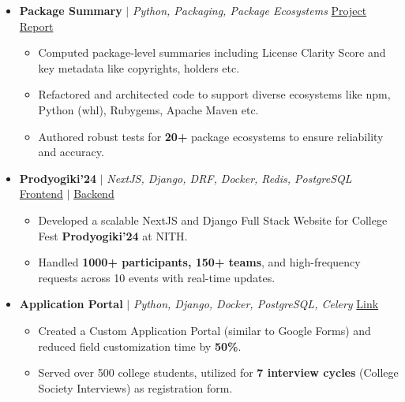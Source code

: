 \documentclass[7pt, legalpaper]{article}
\begin{document}
\begin{itemize}[leftmargin=*]
\item \textbf{Package Summary} $|$ \small \textit{Python, Packaging, Package Ecosystems}  \hfill \href{https://aboutcode.readthedocs.io/en/latest/archive/gsoc/reports/2024/scancode_toolkit_swastkk.html}{Project Report}

\normalsize{
\begin{itemize}[label=$\diamond$,itemsep=0pt, leftmargin=*]
    \item Computed package-level summaries including License Clarity Score and key metadata like copyrights, holders etc.
    \item Refactored and architected code to support diverse ecosystems like npm, Python (whl), Rubygems, Apache Maven etc.
    \item Authored robust tests for \textbf{20+} package ecosystems to ensure reliability and accuracy.
\end{itemize}
}
\item \textbf{Prodyogiki'24} $|$ \small \textit{NextJS, Django, DRF, Docker, Redis, PostgreSQL} \hfill \href{https://github.com/istenith/prody-frontend}{Frontend} $|$ \href{https://github.com/istenith/prody-backend}{Backend}

\normalsize{
\begin{itemize}[label=$\diamond$, leftmargin=*]
    \item Developed a scalable NextJS and Django Full Stack Website for College Fest \textbf{Prodyogiki'24} at NITH.
    \item Handled \textbf{1000+ participants, 150+ teams}, and high-frequency requests across 10 events with real-time updates.
\end{itemize}
}
\item \textbf{Application Portal} $|$  \textit{\small Python, Django, Docker, PostgreSQL, Celery}  \hfill \href{https://github.com/istenith/join.istenith.com}{Link}

\normalsize{
\begin{itemize}[label=$\diamond$, leftmargin=*]
    \item Created a Custom Application Portal (similar to Google Forms) and reduced field customization time by \textbf{50\%}.
    \item Served over 500 college students, utilized for \textbf{7 interview cycles} (College Society Interviews) as registration form.
\end{itemize}
}
\end{itemize}
\end{document}
